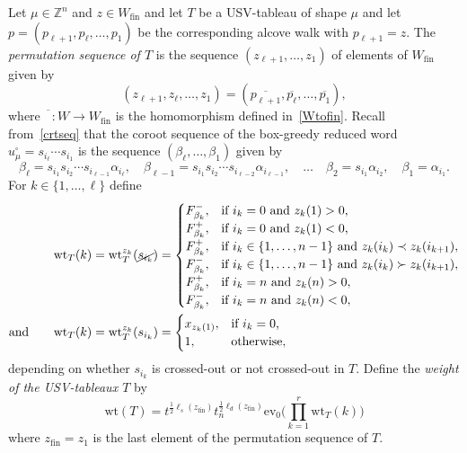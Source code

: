 \documentclass[11pt]{article}
\theoremstyle{plain}
\theoremstyle{definition}
\theoremstyle{remark}
\numberwithin{equation}{section}
\def\ZZ{\mathbb{Z}}
\def\ev{\mathrm{ev}}
\def\wt{\mathrm{wt}}
\newcounter{r}
\newcounter{s}
\begin{document}
Let $\mu\in \ZZ^n$ and $z\in W_{\mathrm{fin}}$ and let $T$ be a USV-tableau of shape $\mu$ and let
$p=(p_{\ell+1},p_\ell, \ldots, p_1)$ be the corresponding alcove walk with $p_{\ell+1}=z$.
The \emph{permutation sequence of $T$} is the sequence $(z_{\ell+1}, \ldots, z_1)$ of elements of 
$W_{\mathrm{fin}}$ given by
\begin{equation}
(z_{\ell+1}, z_\ell, \ldots, z_1) = (\overline{p_{\ell+1}}, \overline{p_\ell}, \ldots, \overline{p_1}),
\label{permseq}
\end{equation}
where $\overline{\phantom{T}}\colon W \longrightarrow  W_{\mathrm{fin}}$ is the homomorphism defined in~\eqref{Wtofin}.
Recall from~\eqref{crtseq} that the coroot sequence of the box-greedy reduced word $u_\mu^\square=s_{i_\ell}\cdots s_{i_1}$ 
is the sequence
$(\beta_\ell,\ldots, \beta_1)$ given by
\begin{equation*}
\beta_\ell = 
s_{i_1}s_{i_2}\cdots s_{i_{\ell-1}}\alpha_{i_\ell}, \quad
\beta_{\ell-1} = 
s_{i_1}s_{i_2}\cdots s_{i_{\ell-2}}\alpha_{i_{\ell-1}}, \quad \ldots \quad
\beta_2 = s_{i_1}\alpha_{i_2}, \quad
\beta_1 = \alpha_{i_1}.
\end{equation*}
For $k\in \{1, \ldots, \ell\}$ define 
\begin{align}
\wt_T(k) = \wt_T^{z_k}(\cancel{s_{i_k}}) 
&= \begin{cases}
F^-_{\beta_k}, &\hbox{if $i_k=0$ and $z_k(1)>0$,} \\
F^+_{\beta_k}, &\hbox{if $i_k=0$ and $z_k(1)<0$,} \\
F^+_{\beta_k}, &\hbox{if $i_k\in \{1, \ldots, n-1\}$ and $z_k(i_k)\prec z_k(i_{k+1})$}, \\
F^-_{\beta_k}, &\hbox{if $i_k\in \{1, \ldots, n-1\}$ and $z_k(i_k)\succ z_k(i_{k+1})$}, \\
F^+_{\beta_k}, &\hbox{if $i_k=n$ and $z_k(n)>0$}, \\
F^-_{\beta_k}, &\hbox{if $i_k=n$ and $z_k(n)<0$},
\end{cases}
\\
\hbox{and}\qquad
\wt_T(k) =\wt_T^{z_k}(s_{i_k}) &= \begin{cases}
x_{z_k(1)}, &\hbox{if $i_k=0$,} \\
1, &\hbox{otherwise,}
\end{cases}
\label{wtTzk}
\end{align}
depending on whether $s_{i_k}$ is crossed-out or not crossed-out in $T$.
Define the \emph{weight of the USV-tableaux $T$} by 
$$\mathrm{wt}(T) = 
t^{\frac12\ell_s(z_{\mathrm{fin}})} t_n^{\frac12\ell_d(z_{\mathrm{fin}})}
\ev_0\Big(\prod_{k=1}^r\wt_{T}(k)\Big) 
$$
where $z_{\mathrm{fin}}=z_1$ is the last element of the permutation sequence of $T$.
\end{document}

